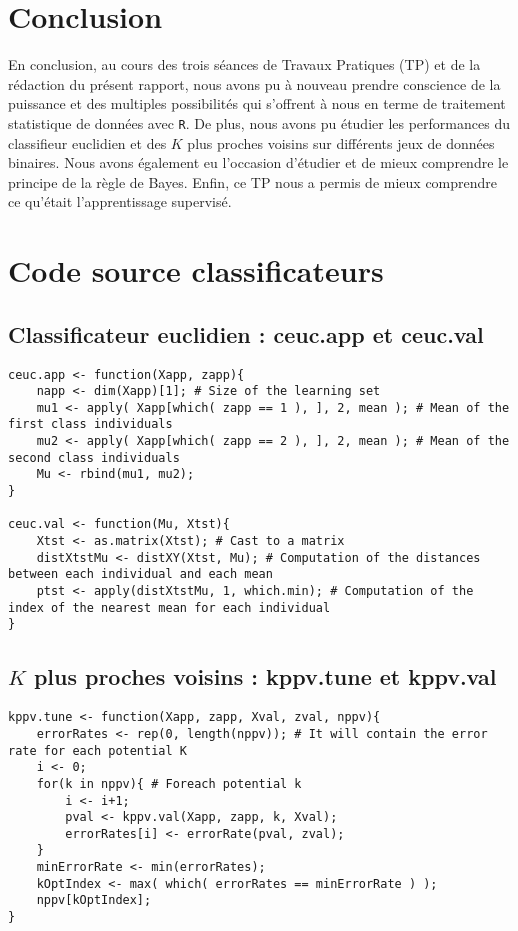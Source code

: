 \documentclass{article}
\begin{document}
\begin{multicols}{2}
\section{Conclusion}
En conclusion, au cours des trois séances de Travaux Pratiques (TP) et de la rédaction du présent rapport, nous avons pu à nouveau prendre conscience de la puissance et des multiples possibilités qui s’offrent à nous en terme de traitement statistique de données avec \texttt{R}. De plus, nous avons pu étudier les performances du classifieur euclidien et des $K$ plus proches voisins sur différents jeux de données binaires. Nous avons également eu l'occasion d'étudier et de mieux comprendre le principe de la règle de Bayes. Enfin, ce TP nous a permis de mieux comprendre ce qu'était l'apprentissage supervisé.

\newpage
\appendix

\section{Code source classificateurs}
\label{app_sec_prog}

\subsection{Classificateur euclidien : ceuc.app et ceuc.val}
\label{app_subsec_prog_ceuc}

\begin{lstlisting}
ceuc.app <- function(Xapp, zapp){
	napp <- dim(Xapp)[1]; # Size of the learning set
	mu1 <- apply( Xapp[which( zapp == 1 ), ], 2, mean ); # Mean of the first class individuals
	mu2 <- apply( Xapp[which( zapp == 2 ), ], 2, mean ); # Mean of the second class individuals
	Mu <- rbind(mu1, mu2);
}

ceuc.val <- function(Mu, Xtst){
	Xtst <- as.matrix(Xtst); # Cast to a matrix
	distXtstMu <- distXY(Xtst, Mu); # Computation of the distances between each individual and each mean
	ptst <- apply(distXtstMu, 1, which.min); # Computation of the index of the nearest mean for each individual
}
\end{lstlisting}

\subsection{$K$ plus proches voisins : kppv.tune et kppv.val}
\label{app_subsec_prog_kppv}

\begin{lstlisting}
kppv.tune <- function(Xapp, zapp, Xval, zval, nppv){
	errorRates <- rep(0, length(nppv)); # It will contain the error rate for each potential K
	i <- 0;
	for(k in nppv){ # Foreach potential k
		i <- i+1;
		pval <- kppv.val(Xapp, zapp, k, Xval);
		errorRates[i] <- errorRate(pval, zval);	
	}
	minErrorRate <- min(errorRates);
	kOptIndex <- max( which( errorRates == minErrorRate ) );
	nppv[kOptIndex];
}


\end{lstlisting}
\end{multicols}
\end{document}
